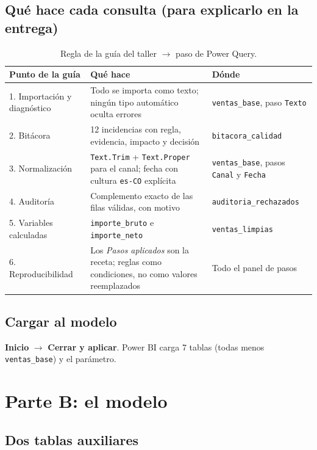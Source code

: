 \documentclass[11pt,letterpaper]{article}
\newcommand{\ui}[1]{\textbf{#1}}                 %
\begin{document}
\subsection{Qué hace cada consulta (para explicarlo en la entrega)}

\begin{table}[H]
\centering
\caption{Regla de la guía del taller $\rightarrow$ paso de Power Query.}
\begin{tabularx}{\linewidth}{l L L}
\toprule
Punto de la guía & Qué hace & Dónde \\
. Importación y diagnóstico & Todo se importa como texto; ningún tipo automático oculta errores & \texttt{ventas\_base}, paso \texttt{Texto} \\
2. Bitácora & 12 incidencias con regla, evidencia, impacto y decisión & \texttt{bitacora\_calidad} \\
3. Normalización & \texttt{Text.Trim} + \texttt{Text.Proper} para el canal; fecha con cultura \texttt{es-CO} explícita & \texttt{ventas\_base}, pasos \texttt{Canal} y \texttt{Fecha} \\
4. Auditoría & Complemento exacto de las filas válidas, con motivo & \texttt{auditoria\_rechazados} \\
5. Variables calculadas & \texttt{importe\_bruto} e \texttt{importe\_neto} & \texttt{ventas\_limpias} \\
6. Reproducibilidad & Los \emph{Pasos aplicados} son la receta; reglas como condiciones, no como valores reemplazados & Todo el panel de pasos \\
\bottomrule
\end{tabularx}
\end{table}

\subsection{Cargar al modelo}

\ui{Inicio} $\rightarrow$ \ui{Cerrar y aplicar}. Power BI carga 7 tablas (todas menos \texttt{ventas\_base}) y el parámetro.

\section{Parte B: el modelo}

\subsection{Dos tablas auxiliares}
\end{document}
